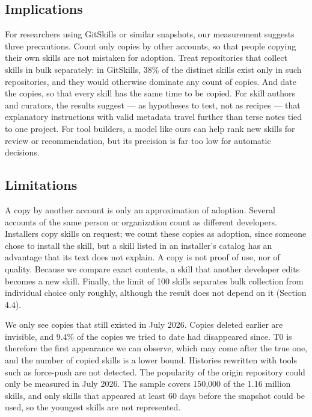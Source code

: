 \subsection{Implications}\label{implications}

For researchers using GitSkills or similar snapshots, our measurement
suggests three precautions. Count only copies by other accounts, so that
people copying their own skills are not mistaken for adoption. Treat
repositories that collect skills in bulk separately: in GitSkills, 38\%
of the distinct skills exist only in such repositories, and they would
otherwise dominate any count of copies. And date the copies, so that
every skill has the same time to be copied. For skill authors and
curators, the results suggest --- as hypotheses to test, not as recipes
--- that explanatory instructions with valid metadata travel further
than terse notes tied to one project. For tool builders, a model like
ours can help rank new skills for review or recommendation, but its
precision is far too low for automatic decisions.

\subsection{Limitations}\label{limitations}

A copy by another account is only an approximation of adoption. Several
accounts of the same person or organization count as different
developers. Installers copy skills on request; we count these copies as
adoption, since someone chose to install the skill, but a skill listed
in an installer's catalog has an advantage that its text does not
explain. A copy is not proof of use, nor of quality. Because we compare
exact contents, a skill that another developer edits becomes a new
skill. Finally, the limit of 100 skills separates bulk collection from
individual choice only roughly, although the result does not depend on
it (Section 4.4).

We only see copies that still existed in July 2026. Copies deleted
earlier are invisible, and 9.4\% of the copies we tried to date had
disappeared since. T0 is therefore the first appearance we can observe,
which may come after the true one, and the number of copied skills is a
lower bound. Histories rewritten with tools such as force-push are not
detected. The popularity of the origin repository could only be measured
in July 2026. The sample covers 150,000 of the 1.16 million skills, and
only skills that appeared at least 60 days before the snapshot could be
used, so the youngest skills are not represented.

